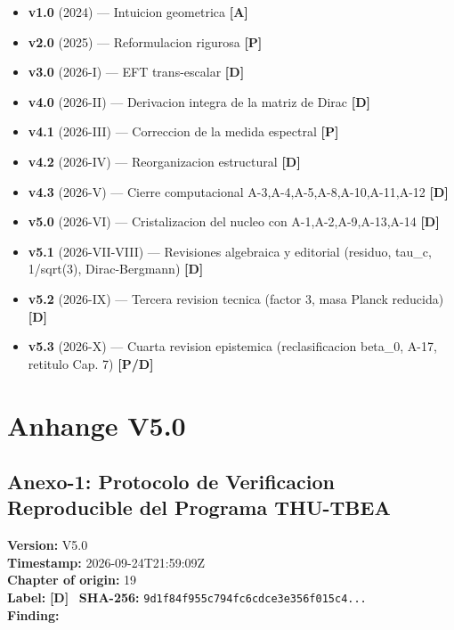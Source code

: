 ﻿\documentclass[11pt,letterpaper]{article}
\begin{document}
\begin{itemize}[leftmargin=*]
\item \textbf{v1.0} (2024) --- Intuicion geometrica \textcolor{Ayellow}{\textbf{[A]}}
\item \textbf{v2.0} (2025) --- Reformulacion rigurosa \textcolor{Ppurple}{\textbf{[P]}}
\item \textbf{v3.0} (2026-I) --- EFT trans-escalar \textcolor{Dgreen}{\textbf{[D]}}
\item \textbf{v4.0} (2026-II) --- Derivacion integra de la matriz de Dirac \textcolor{Dgreen}{\textbf{[D]}}
\item \textbf{v4.1} (2026-III) --- Correccion de la medida espectral \textcolor{Ppurple}{\textbf{[P]}}
\item \textbf{v4.2} (2026-IV) --- Reorganizacion estructural \textcolor{Dgreen}{\textbf{[D]}}
\item \textbf{v4.3} (2026-V) --- Cierre computacional A-3,A-4,A-5,A-8,A-10,A-11,A-12 \textcolor{Dgreen}{\textbf{[D]}}
\item \textbf{v5.0} (2026-VI) --- Cristalizacion del nucleo con A-1,A-2,A-9,A-13,A-14 \textcolor{Dgreen}{\textbf{[D]}}
\item \textbf{v5.1} (2026-VII-VIII) --- Revisiones algebraica y editorial (residuo, tau\_c, 1/sqrt(3), Dirac-Bergmann) \textcolor{Dgreen}{\textbf{[D]}}
\item \textbf{v5.2} (2026-IX) --- Tercera revision tecnica (factor 3, masa Planck reducida) \textcolor{Dgreen}{\textbf{[D]}}
\item \textbf{v5.3} (2026-X) --- Cuarta revision epistemica (reclasificacion beta\_0, A-17, retitulo Cap. 7) \textcolor{Ppurple}{\textbf{[P/D]}}
\end{itemize}

\newpage
\section*{Anhange V5.0}

\subsection*{Anexo-1: Protocolo de Verificacion Reproducible del Programa THU-TBEA}
\textbf{Version:} V5.0 \\
\textbf{Timestamp:} 2026-09-24T21:59:09Z \\
\textbf{Chapter of origin:} 19 \\
\textbf{Label:} \textcolor{Dgreen}{\textbf{[D]}} \
\textbf{SHA-256:} \texttt{9d1f84f955c794fc6cdce3e356f015c4...} \\[0.5em]
\textbf{Finding:}
\end{document}
